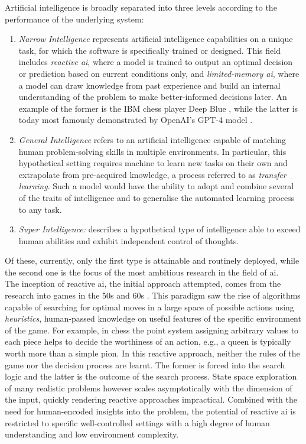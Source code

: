 Artificial intelligence is broadly separated into three levels according to the performance of the underlying system: 
\begin{enumerate}
    \item \textit{Narrow Intelligence} represents artificial intelligence capabilities on a unique task, for which the software is specifically trained or designed. This field includes \textit{reactive \gls{ai}}, where a model is trained to output an optimal decision or prediction based on current conditions only, and \textit{limited-memory \gls{ai}}, where a model can draw knowledge from past experience and build an internal understanding of the problem to make better-informed decisions later. An example of the former is the IBM chess player Deep Blue \cite{CAMPBELL200257}, while the latter is today most famously demonstrated by OpenAI's GPT-4 model \cite{openai2024gpt4}. 
    \item \textit{General Intelligence} refers to an artificial intelligence capable of matching human problem-solving skills in multiple environments. In particular, this hypothetical setting requires machine to learn new tasks on their own and extrapolate from pre-acquired knowledge, a process referred to as \textit{transfer learning}. Such a model would have the ability to adopt and combine several of the traits of intelligence and to generalise the automated learning process to any task.
    \item \textit{Super Intelligence:} describes a hypothetical type of intelligence able to exceed human abilities and exhibit independent control of thoughts. 
\end{enumerate}
Of these, currently, only the first type is attainable and routinely deployed, while the second one is the focus of the most ambitious research in the field of \gls{ai}. \\

The inception of reactive \gls{ai}, the initial approach attempted, comes from the research into games in the 50s and 60s \cite{russel2010}. This paradigm saw the rise of algorithms capable of searching for optimal moves in a large space of possible actions using \textit{heuristics}, human-passed knowledge on useful features of the specific environment of the game. For example, in chess the point system assigning arbitrary values to each piece helps to decide the worthiness of an action, e.g., a queen is typically worth more than a simple pion. In this reactive approach, neither the rules of the game nor the decision process are learnt. The former is forced into the search logic and the latter is the outcome of the search process. State space exploration of many realistic problems however scales asymptotically with the dimension of the input, quickly rendering reactive approaches impractical. Combined with the need for human-encoded insights into the problem, the potential of reactive \gls{ai} is restricted to specific well-controlled settings with a high degree of human understanding and low environment complexity. \\

